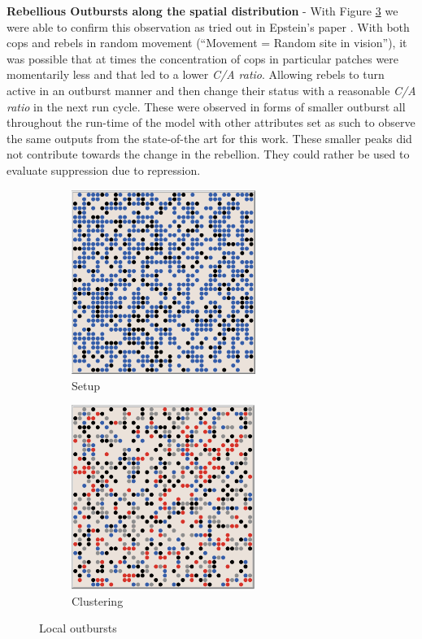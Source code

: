 \documentclass[a4paper,11pt]{article}
\begin{document}
\textbf{Rebellious Outbursts along the spatial distribution} - 
With Figure \ref{fig:fig2} we were able to confirm this observation as tried out in Epstein’s paper \cite{epstein2002modeling}. With both cops and rebels in random movement (“Movement = Random site in vision”), it was possible that at times the concentration of cops in particular patches were momentarily less and that led to a lower \textit{C/A ratio}. Allowing rebels to turn active in an outburst manner and then change their status with a reasonable \textit{C/A ratio} in the next run cycle. These were observed in forms of smaller outburst all throughout the run-time of the model with other attributes set as such to observe the same outputs from the state-of-the art for this work. These smaller peaks did not contribute towards the change in the rebellion. They could rather be used to evaluate suppression due to repression. 
\\

\begin{figure}[h]
 \begin{subfigure}{0.5\textwidth}
  \includegraphics[width=0.8\linewidth, height=6cm]{INITIAL_setup.png} 
  \caption{Setup}
  \label{fig:subim1}
 \end{subfigure}
 \begin{subfigure}{0.5\textwidth}
  \includegraphics[width=0.8\linewidth, height=6cm]{VISUAL.png}
  \caption{Clustering}
  \label{fig:subim2}
 \end{subfigure}

\caption{Local outbursts}
\label{fig:fig2}
\end{figure}
\end{document}
